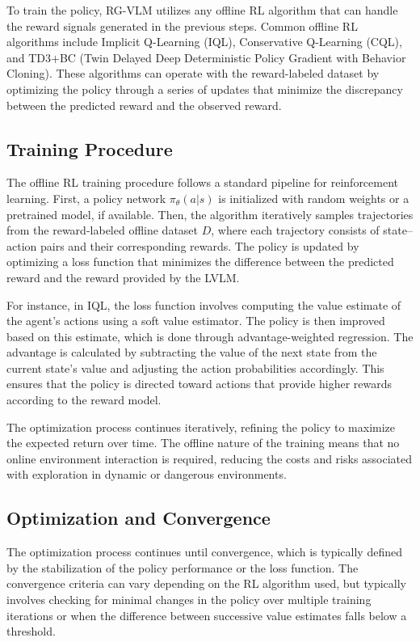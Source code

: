 \documentclass[master,english,final]{kaist-ucs}
\begin{document}
To train the policy, RG-VLM utilizes any offline RL algorithm that can handle the reward signals generated in the previous steps. Common offline RL algorithms include Implicit Q-Learning (IQL)\cite{kostrikov2021offline}, Conservative Q-Learning (CQL)\cite{kumar2020conservative}, and TD3+BC (Twin Delayed Deep Deterministic Policy Gradient with Behavior Cloning)\cite{fujimoto2021minimalist}. These algorithms can operate with the reward-labeled dataset by optimizing the policy through a series of updates that minimize the discrepancy between the predicted reward and the observed reward.

\subsection{Training Procedure}
The offline RL training procedure follows a standard pipeline for reinforcement learning. First, a policy network $\pi_\theta(a|s)$ is initialized with random weights or a pretrained model, if available. Then, the algorithm iteratively samples trajectories from the reward-labeled offline dataset $D$, where each trajectory consists of state–action pairs and their corresponding rewards. The policy is updated by optimizing a loss function that minimizes the difference between the predicted reward and the reward provided by the LVLM.

For instance, in IQL\cite{kostrikov2021offline}, the loss function involves computing the value estimate of the agent’s actions using a soft value estimator. The policy is then improved based on this estimate, which is done through advantage-weighted regression. The advantage is calculated by subtracting the value of the next state from the current state's value and adjusting the action probabilities accordingly. This ensures that the policy is directed toward actions that provide higher rewards according to the reward model.

The optimization process continues iteratively, refining the policy to maximize the expected return over time. The offline nature of the training means that no online environment interaction is required, reducing the costs and risks associated with exploration in dynamic or dangerous environments.

\subsection{Optimization and Convergence}
The optimization process continues until convergence, which is typically defined by the stabilization of the policy performance or the loss function. The convergence criteria can vary depending on the RL algorithm used, but typically involves checking for minimal changes in the policy over multiple training iterations or when the difference between successive value estimates falls below a threshold.
\end{document}
